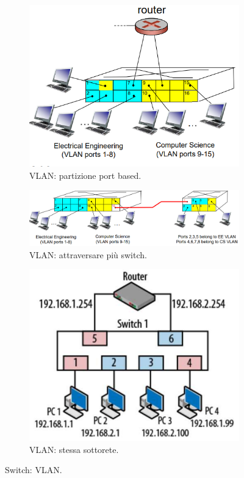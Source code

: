 \documentclass[11pt, italian, openany]{book}
\begin{document}
\begin{sloppypar}
\begin{figure}[!h]
	\begin{subfigure}[t]{0.33 \linewidth} \centering
		\includegraphics[scale=0.25]{images/vlan-port-based.png}
		\caption{VLAN: partizione port based.}
	\end{subfigure}
	\begin{subfigure}[t]{0.33 \linewidth} \centering
		\includegraphics[scale=0.18]{images/vlan-switch-multipli.png}
		\caption{VLAN: attraversare pi\`u switch.}
	\end{subfigure}
	\begin{subfigure}[t]{0.33 \linewidth} \centering
		\includegraphics[scale=0.25]{images/vlan-e-sottoreti.png}
		\caption{VLAN: stessa sottorete.}
	\end{subfigure}
	\caption{Switch: VLAN.}
	\label{fig:switch-vlan}
\end{figure}

\end{sloppypar}
\end{document}

